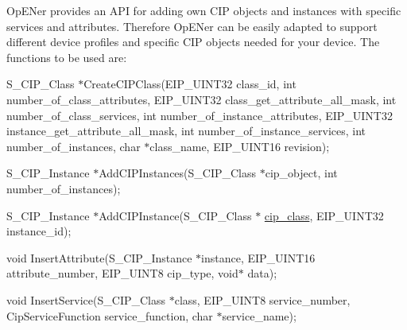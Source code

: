 \-Op\-E\-Ner provides an \-A\-P\-I for adding own \-C\-I\-P objects and instances with specific services and attributes. \-Therefore \-Op\-E\-Ner can be easily adapted to support different device profiles and specific \-C\-I\-P objects needed for your device. \-The functions to be used are\-:
\begin{DoxyItemize}
\item \-S\-\_\-\-C\-I\-P\-\_\-\-Class $\ast$\-Create\-C\-I\-P\-Class(\-E\-I\-P\-\_\-\-U\-I\-N\-T32 class\-\_\-id, int number\-\_\-of\-\_\-class\-\_\-attributes, \-E\-I\-P\-\_\-\-U\-I\-N\-T32 class\-\_\-get\-\_\-attribute\-\_\-all\-\_\-mask, int number\-\_\-of\-\_\-class\-\_\-services, int number\-\_\-of\-\_\-instance\-\_\-attributes, \-E\-I\-P\-\_\-\-U\-I\-N\-T32 instance\-\_\-get\-\_\-attribute\-\_\-all\-\_\-mask, int number\-\_\-of\-\_\-instance\-\_\-services, int number\-\_\-of\-\_\-instances, char $\ast$class\-\_\-name, \-E\-I\-P\-\_\-\-U\-I\-N\-T16 revision);
\item \-S\-\_\-\-C\-I\-P\-\_\-\-Instance $\ast$\-Add\-C\-I\-P\-Instances(\-S\-\_\-\-C\-I\-P\-\_\-\-Class $\ast$cip\-\_\-object, int number\-\_\-of\-\_\-instances);
\item \-S\-\_\-\-C\-I\-P\-\_\-\-Instance $\ast$\-Add\-C\-I\-P\-Instance(\-S\-\_\-\-C\-I\-P\-\_\-\-Class $\ast$ \hyperlink{structcip__class}{cip\-\_\-class}, \-E\-I\-P\-\_\-\-U\-I\-N\-T32 instance\-\_\-id);
\item void \-Insert\-Attribute(\-S\-\_\-\-C\-I\-P\-\_\-\-Instance $\ast$instance, \-E\-I\-P\-\_\-\-U\-I\-N\-T16 attribute\-\_\-number, \-E\-I\-P\-\_\-\-U\-I\-N\-T8 cip\-\_\-type, void$\ast$ data);
\item void \-Insert\-Service(\-S\-\_\-\-C\-I\-P\-\_\-\-Class $\ast$class, \-E\-I\-P\-\_\-\-U\-I\-N\-T8 service\-\_\-number, \-Cip\-Service\-Function service\-\_\-function, char $\ast$service\-\_\-name); 
\end{DoxyItemize}